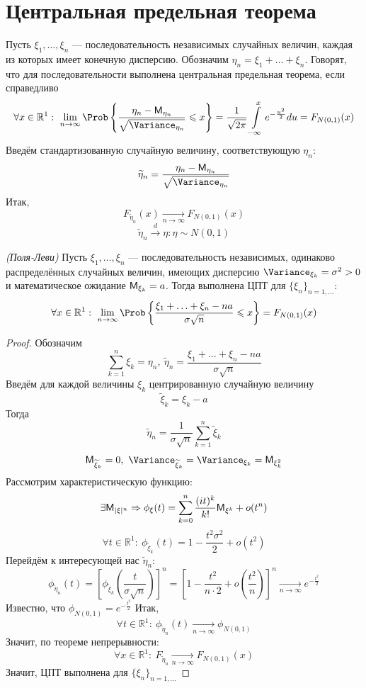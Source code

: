 \section{Центральная предельная теорема}
Пусть $\xi_1, \ldots, \xi_n$ --- последовательность независимых случайных величин, каждая из которых имеет конечную дисперсию. Обозначим $\eta_n = \xi_1 + \ldots + \xi_n$. Говорят, что для последовательности выполнена центральная предельная теорема, если справедливо
\[
	\forall x \in \mathbb{R}^1: \ \lim\limits_{n \to \infty} \Prob \left\{ \frac{\eta_n - \MExpect_{\eta_n}}{\sqrt{\Variance_{\eta_n}}} \leqslant x \right\} = \frac{1}{\sqrt{2 \pi}} \int\limits_{-\infty}^{x} e^{- \frac{u^2}{2}} du = F_{N(0,1)} (x)
\]
Введём стандартизованную случайную величину, соответствующую $\eta_n$:
\[
	\widetilde{\eta}_n = \frac{\eta_n - \MExpect_{\eta_n}}{\sqrt{\Variance_{\eta_n}}}
\]
Итак,
\[
	F_{\widetilde{\eta}_n} (x) \underset{n \to \infty}{\rightarrow} F_{N(0, 1)} (x)
\]
\[
	\widetilde{\eta}_n \overset{d}{\rightarrow} \eta: \eta \sim N(0, 1)
\]
\begin{theorem}
	\textit{(Поля-Леви)} Пусть $\xi_1, \ldots, \xi_n$ --- последовательность независимых, одинаково распределённых случайных величин, имеющих дисперсию $\Variance_{\xi_k} = \sigma^2 > 0$ и математическое ожидание $\mathsf{M}_{\xi_k} = a$. Тогда выполнена ЦПТ для $\{ \xi_n \}_{n = 1, \ldots}$:
\[
	\forall x \in \mathbb{R}^1: \ \lim\limits_{n \to \infty} \Prob \left\{ \frac{\xi_1 + \ldots + \xi_n - na}{\sigma \sqrt{n}} \leqslant x \right\} = F_{N(0, 1)} (x)
\]
\end{theorem}
\begin{proof}
	Обозначим
	\[
		\sum\limits_{k = 1}^{n} \xi_k = \eta_n, \ \widetilde{\eta}_n = \frac{\xi_1 + \ldots + \xi_n - na}{\sigma \sqrt{n}} 
	\]
	Введём для каждой величины $\xi_k$ центрированную случайную величину
	\[
		\widetilde{\xi}_k = \xi_k - a
	\]
	Тогда
	\[
		\widetilde{\eta}_n = \frac{1}{\sigma \sqrt{n}} \sum\limits_{k = 1}^{n} \widetilde{\xi}_k
	\]
	\[
		\MExpect_{\widetilde{\xi}_k} = 0, \ \Variance_{\widetilde{\xi}_k} = \Variance_{\xi_k} = \MExpect_{\xi_k^2}
	\]
	Рассмотрим характеристическую функцию:
	\[
		\exists \mathsf{M}_{|\xi|^n} \Rightarrow \phi_{\xi} (t) = \sum\limits_{k = 0}^{n} \frac{(it)^k}{k!} \mathsf{M}_{\xi^k} + o(t^n)
	\]
	\[
		\forall t \in \mathbb{R}^1: \ \phi_{{\widetilde{\xi}_k}} (t) = 1 - \frac{t^2 \sigma^2}{2} + o(t^2)
	\]
	Перейдём к интересующей нас $\widetilde{\eta}_n$:
	\[
		\phi_{\widetilde{\eta}_n} (t) = \left[ \phi_{\widetilde{\xi}_k} \left( \frac{t}{\sigma \sqrt{n}} \right) \right]^n = \left[ 1 - \frac{t^2}{n \cdot 2} + o \left( \frac{t^2}{n} \right) \right]^n \underset{n \to \infty}{\rightarrow} e^{- \frac{t^2}{2}}
	\]
	Известно, что $\phi_{N(0, 1)} = e^{- \frac{t^2}{2}}$
	Итак,
	\[
		\forall t \in \mathbb{R}^1: \ \phi_{\widetilde{\eta}_n} (t) \underset{n \to \infty}{\rightarrow} \phi_{N(0, 1)}
	\]
	Значит, по теореме непрерывности:
	\[
		\forall x \in \mathbb{R}^1: \ F_{\widetilde{\eta}_n} \underset{n \to \infty}{\rightarrow} F_{N(0, 1)} (x)
	\]
	Значит, ЦПТ выполнена для $\{ \xi_n \}_{n = 1, \ldots}$
\end{proof}
